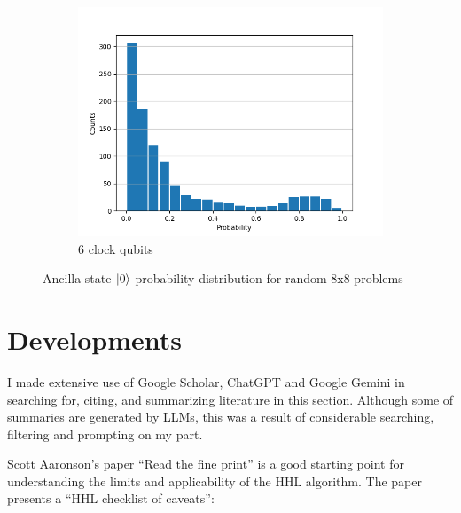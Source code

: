 \documentclass[12pt]{extarticle}
\begin{document}
\begin{figure}[htbp]
\begin{subfigure}[b]{0.45\textwidth}
        \centering
        \includegraphics[width=\textwidth]{images/ancilla_frequency_dist_8x8b6.png}
        \caption{6 clock qubits}
    \end{subfigure}
    \hfill
    \caption{Ancilla state $\ket{0}$ probability distribution for random 8x8 problems}
    \label{fig:ancilla_frequency_dist_8x8}
\end{figure}

\newpage

\section{Developments}\label{sec:developments}

\begin{framed}
I made extensive use of Google Scholar, ChatGPT and Google Gemini in searching for, citing, and summarizing literature in this section.
Although some of summaries are generated by LLMs, this was a result of considerable searching, filtering and prompting on my part.
\end{framed}

Scott Aaronson's paper ``Read the fine print'' \cite{aaronson2015read} is a good starting point for understanding the limits and applicability of the HHL algorithm.
The paper presents a ``HHL checklist of caveats'':
\end{document}
